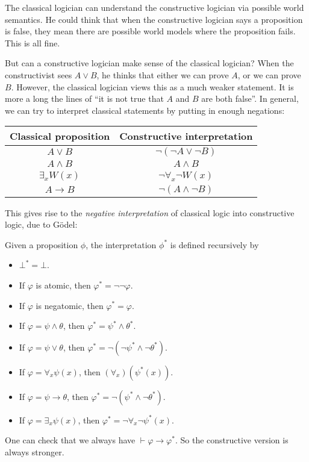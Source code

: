 \documentclass[a4paper]{article}
\begin{document}
The classical logician can understand the constructive logician via possible world semantics. He could think that when the constructive logician says a proposition is false, they mean there are possible world models where the proposition fails. This is all fine.

But can a constructive logician make sense of the classical logician? When the constructivist sees $A \vee B$, he thinks that either we can prove $A$, or we can prove $B$. However, the classical logician views this as a much weaker statement. It is more a long the lines of ``it is not true that $A$ and $B$ are both false''. In general, we can try to interpret classical statements by putting in enough negations:
\begin{center}
  \begin{tabular}{cc}
    \toprule
    Classical proposition & Constructive interpretation\\
    \midrule
    $A \vee B$ & $\neg (\neg A \vee \neg B)$\\
    $A \wedge B$& $A \wedge B$\\
    $\exists_x W(x)$ & $\neg \forall_x \neg W(x)$\\
    $A \to B$ & $\neg (A \wedge \neg B)$\\
    \bottomrule
  \end{tabular}
\end{center}
This gives rise to the \emph{negative interpretation} of classical logic into constructive logic, due to G\"odel:
\begin{defi}
  Given a proposition $\phi$, the interpretation $\phi^*$ is defined recursively by
  \begin{itemize}
    \item $\bot^* = \bot$.
    \item If $\varphi$ is atomic, then $\varphi^* = \neg\neg \varphi$.
    \item If $\varphi$ is negatomic, then $\varphi^* = \varphi$.
    \item If $\varphi = \psi \wedge \theta$, then $\varphi^* = \psi^* \wedge \theta^*$.
    \item If $\varphi = \psi \vee \theta$, then $\varphi^* = \neg (\neg \psi^* \wedge \neg \theta^*)$.
    \item If $\varphi = \forall_x \psi(x)$, then $(\forall_x)(\psi^*(x))$.
    \item If $\varphi = \psi \to \theta$, then $\varphi^* = \neg(\psi^* \wedge \neg \theta^*)$.
    \item If $\varphi = \exists_x \psi(x)$, then $\varphi^* = \neg \forall_x \neg \psi^*(x)$.
  \end{itemize}
\end{defi}
One can check that we always have $\vdash \varphi \to \varphi^*$. So the constructive version is always stronger.
\end{document}
